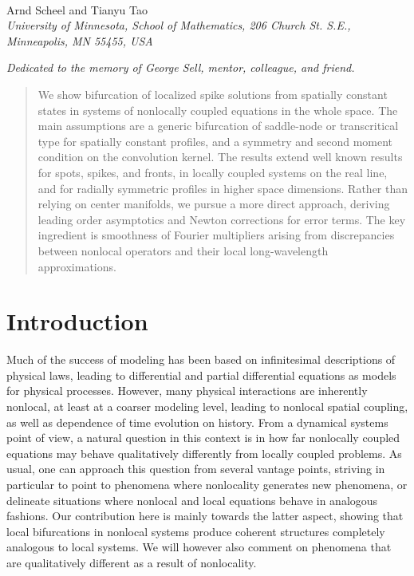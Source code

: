 \documentclass[10pt]{article}
\begin{document}
\begin{center}

{\fontsize{17}{17}\selectfont{Bifurcation to coherent structures in nonlocally coupled systems}}\\[0.2in]
Arnd Scheel and Tianyu Tao\\
\textit{\footnotesize 
University of Minnesota, School of Mathematics,   206 Church St. S.E., Minneapolis, MN 55455, USA}
\date{\small \today} 
\vspace*{0.2in}

\textit{Dedicated to the memory of George Sell, mentor, colleague, and friend.}
\end{center}

\vspace*{0.2in}


\begin{abstract}
\noindent 
We show bifurcation of localized spike solutions from spatially constant states in systems of nonlocally coupled equations in the whole space. The main assumptions are a generic bifurcation of saddle-node or transcritical type for spatially constant profiles, and a symmetry and second moment condition on the convolution kernel. The results extend well known results for spots, spikes, and fronts, in locally coupled systems on the real line, and for radially symmetric profiles in higher space dimensions. Rather than relying on center manifolds, we pursue a more direct approach, deriving leading order asymptotics and Newton corrections for error terms. The key ingredient is smoothness of Fourier multipliers arising from discrepancies between nonlocal operators and their local long-wavelength approximations. 
\end{abstract}


\section{Introduction}\label{s:1}
Much of the success of modeling has been based on infinitesimal descriptions of physical laws, leading to differential and partial differential equations as models for physical processes. However, many physical interactions are inherently nonlocal, at least at a coarser modeling level, leading to nonlocal spatial coupling, as well as dependence of time evolution on history. From a dynamical systems point of view, a natural question in this context is in how far nonlocally coupled equations may behave qualitatively differently from locally coupled problems. As usual, one can approach this question from several vantage points, striving in particular to point to phenomena where nonlocality generates new phenomena, or delineate situations where nonlocal and local equations behave in analogous fashions. Our contribution here is mainly towards the latter aspect, showing that local bifurcations in nonlocal systems produce coherent structures completely analogous to local systems. We will however also comment on phenomena that are qualitatively different as a result of nonlocality. 
\end{document}
